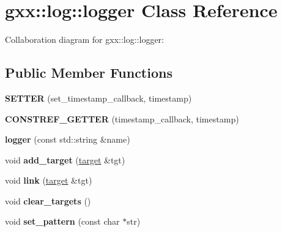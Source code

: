 \hypertarget{classgxx_1_1log_1_1logger}{}\section{gxx\+:\+:log\+:\+:logger Class Reference}
\label{classgxx_1_1log_1_1logger}


Collaboration diagram for gxx\+:\+:log\+:\+:logger\+:
\subsection*{Public Member Functions}
\begin{DoxyCompactItemize}
\item 
{\bfseries S\+E\+T\+T\+ER} (set\+\_\+timestamp\+\_\+callback, timestamp)\hypertarget{classgxx_1_1log_1_1logger_a9e8eee6d96d3cf95f644609a7e299467}{}\label{classgxx_1_1log_1_1logger_a9e8eee6d96d3cf95f644609a7e299467}

\item 
{\bfseries C\+O\+N\+S\+T\+R\+E\+F\+\_\+\+G\+E\+T\+T\+ER} (timestamp\+\_\+callback, timestamp)\hypertarget{classgxx_1_1log_1_1logger_a9519ac057f2caa5518a7bedc034aa276}{}\label{classgxx_1_1log_1_1logger_a9519ac057f2caa5518a7bedc034aa276}

\item 
{\bfseries logger} (const std\+::string \&name)\hypertarget{classgxx_1_1log_1_1logger_a57a7376523eded2fc208655150a24bff}{}\label{classgxx_1_1log_1_1logger_a57a7376523eded2fc208655150a24bff}

\item 
void {\bfseries add\+\_\+target} (\hyperlink{classgxx_1_1log_1_1target}{target} \&tgt)\hypertarget{classgxx_1_1log_1_1logger_aa6ed0c4891fc88603dd803bf113efaf0}{}\label{classgxx_1_1log_1_1logger_aa6ed0c4891fc88603dd803bf113efaf0}

\item 
void {\bfseries link} (\hyperlink{classgxx_1_1log_1_1target}{target} \&tgt)\hypertarget{classgxx_1_1log_1_1logger_ac8968abdae5464d692d37a99676b803c}{}\label{classgxx_1_1log_1_1logger_ac8968abdae5464d692d37a99676b803c}

\item 
void {\bfseries clear\+\_\+targets} ()\hypertarget{classgxx_1_1log_1_1logger_a148f0cfe3888ef3555124fb1765251bf}{}\label{classgxx_1_1log_1_1logger_a148f0cfe3888ef3555124fb1765251bf}

\item 
void {\bfseries set\+\_\+pattern} (const char $\ast$str)\hypertarget{classgxx_1_1log_1_1logger_a9527a43dfe0e6d325084767ae01dcc9b}{}\label{classgxx_1_1log_1_1logger_a9527a43dfe0e6d325084767ae01dcc9b}


\end{DoxyCompactItemize}
